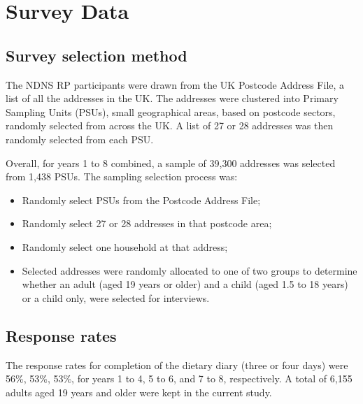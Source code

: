 
\section{Survey Data}\vspace{-0.3cm}

\subsection{Survey selection method}\vspace{-0.3cm}

The NDNS RP participants were drawn from the UK Postcode Address File, a list of all the addresses in the UK. The addresses were clustered into Primary Sampling Units (PSUs), small geographical areas, based on postcode sectors, randomly selected from across the UK. A list of 27 or 28 addresses was then randomly selected from each PSU.

Overall, for years 1 to 8 combined, a sample of 39,300 addresses was selected from 1,438 PSUs. The sampling selection process was: 

\begin{itemize}
	\item Randomly select PSUs from the Postcode Address File; 
	\item Randomly select 27 or 28 addresses in that postcode area; 
	\item Randomly select one household at that address; 
	\item Selected addresses were randomly allocated to one of two groups to determine whether an adult (aged 19 years or older) and a child (aged 1.5 to 18 years) or a child only, were selected for interviews.
\end{itemize}
\vspace{-0.6cm}
\subsection{Response rates}\vspace{-0.3cm}

The response rates for completion of the dietary diary (three or four days) were 56\%, 53\%, 53\%, for years 1 to 4, 5 to 6, and 7 to 8, respectively. A total of 6,155 adults aged 19 years and older were kept in the current study. 
\vspace{-0.6cm}

